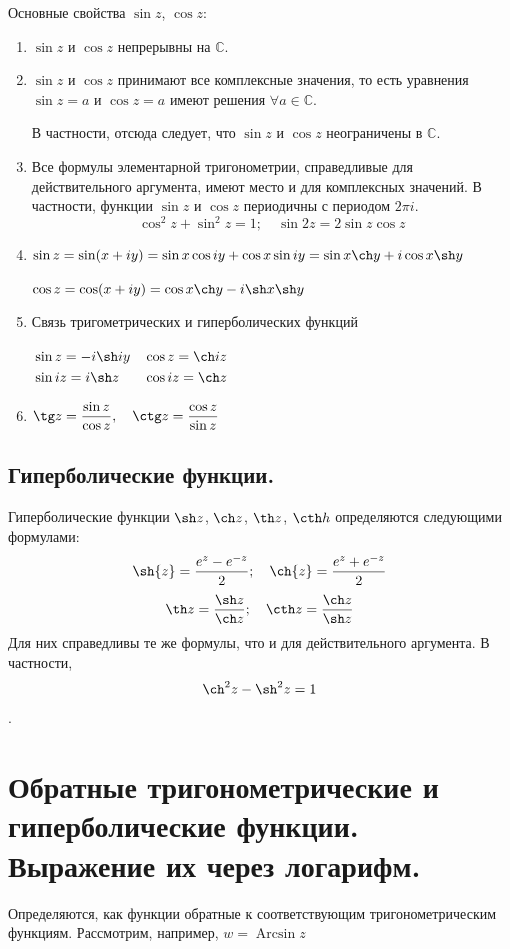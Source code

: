 \documentclass[a4paper, 12pt]{report}
\DeclareMathOperator\Arcsin{Arcsin}
\begin{document}
Основные свойства $\sin{z}$, $\cos{z}$:
\begin{enumerate}
    \item $\sin{z}$ и $\cos{z}$ непрерывны на $\mathbb{C}$.
    \item $\sin{z}$ и $\cos{z}$ принимают все комплексные значения, то есть уравнения $\sin{z}=a$ и $\cos{z}=a$ имеют решения $\forall a \in \mathbb{C}$.
    
    В частности, отсюда следует, что $\sin{z}$ и $\cos{z}$ неограничены в $\mathbb{C}$.
    \item Все формулы элементарной тригонометрии, справедливые для действительного аргумента, имеют место и для комплексных значений. В частности, функции $\sin{z}$ и $\cos{z}$ периодичны с периодом $2\pi i$.
    \[
        \cos^2{z} + \sin^2{z} = 1; \quad \sin{2z} = 2\sin{z}\cos{z}    
    \]
    \item $\sin{z} = \sin(x+iy) = \sin{x}\cos{iy}+\cos{x}\sin{iy} = \sin{x}\ch y + i\cos x \sh y$

    $\cos z = \cos(x+iy) = \cos x \ch y - i\sh x \sh y$
    \item Связь тригометрических и гиперболических функций
    
    $\begin{aligned}[t]
        &\sin z  = -i\sh iy & &\cos z  = \ch iz\\
        &\sin iz = i\sh z   & &\cos iz = \ch z
    \end{aligned}
    $
    \item $\displaystyle \tg z = \frac{\sin z}{\cos z}, \quad \ctg z = \frac{\cos z}{\sin z}$
\end{enumerate}
\subsection{Гиперболические функции.}
Гиперболические функции $\sh z$, $\ch z$, $\th z$, $\cth h$ определяются следующими формулами:
\[ \sh{z}=\frac{e^{z}-e^{-z}}{2}; \quad \ch{z}=\frac{e^{z}+e^{-z}}{2} \]
\[ \th z = \frac{\sh z}{\ch z}; \quad \cth z = \frac{\ch z}{\sh z} \]
Для них справедливы те же формулы, что и для действительного аргумента. В частности,
\[ \ch^2 z - \sh^2 z = 1\].




\section{Обратные тригонометрические и гиперболические функции. Выражение их через логарифм.}
Определяются, как функции обратные к соответствующим тригонометрическим функциям. Рассмотрим, например, $w=\Arcsin z$
\end{document}
